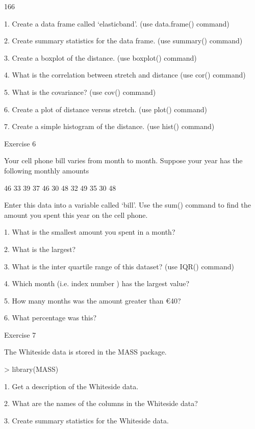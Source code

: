 166
 

 
1.
Create a data frame called ‘elasticband’. (use data.frame() command)

2.
Create summary statistics for the data frame.   (use summary() command)

3.
Create a boxplot of the distance.   (use boxplot() command)

4.
What is the correlation between stretch and distance (use cor() command)

5.
What is the covariance?  (use cov() command)

6.
Create a plot of distance versus stretch.  (use plot() command)             

7.
Create a simple histogram of the distance. (use hist() command)


 

Exercise 6

 

Your cell phone bill varies from month to month. Suppose your year has the following monthly amounts

 

46 33 39 37 46 30 48 32 49 35 30 48

 

Enter this data into a variable called ‘bill’. Use the sum() command to find the amount you spent this year on the cell phone.

 

1.      What is the smallest amount you spent in a month?

2.      What is the largest?

3.      What is the inter quartile range of this dataset?  (use IQR() command)

4.      Which month (i.e. index number ) has the largest value?

5.      How many months was the amount greater than €40?

6.      What percentage was this?

 

 Exercise 7

 

The Whiteside data is stored in the MASS package.

 

> library(MASS)

 
1.
Get a description of the Whiteside data.

2.
What are the names of the columns in the Whiteside data?

3.
Create summary statistics for the Whiteside data.

